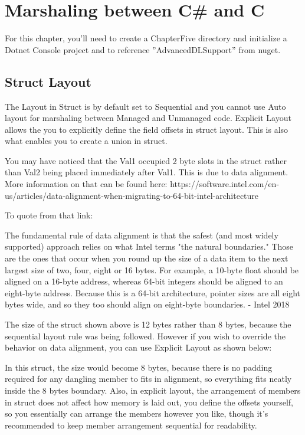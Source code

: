 \chapter{Marshaling between C\# and C}
For this chapter, you'll need to create a ChapterFive directory and initialize a Dotnet Console project and to reference ''AdvancedDLSupport'' from nuget.

\section{Struct Layout}
The Layout in Struct is by default set to Sequential and you cannot use Auto layout for marshaling between Managed and Unmanaged code. Explicit Layout allows the you to explicitly define the field offsets in struct layout. This is also what enables you to  create a union in struct.



You may have noticed that the Val1 occupied 2 byte slots in the struct rather than Val2 being placed immediately after Val1. This is due to data alignment.  More information on that can be found here: https://software.intel.com/en-us/articles/data-alignment-when-migrating-to-64-bit-intel-architecture

To quote from that link:

\begin{coloredbox}
	The fundamental rule of data alignment is that the safest (and most widely supported) approach relies on what Intel terms "the natural boundaries." Those are the ones that occur when you round up the size of a data item to the next largest size of two, four, eight or 16 bytes. For example, a 10-byte float should be aligned on a 16-byte address, whereas 64-bit integers should be aligned to an eight-byte address. Because this is a 64-bit architecture, pointer sizes are all eight bytes wide, and so they too should align on eight-byte boundaries. - Intel 2018
\end{coloredbox}

The size of the struct shown above is 12 bytes rather than 8 bytes, because the sequential layout rule was being followed. However if you wish to override the behavior on data alignment, you can use Explicit Layout as shown below:
\newpage


In this struct, the size would become 8 bytes, because there is no padding required for any dangling member to fits in alignment, so everything fits neatly inside the 8 bytes boundary. Also, in explicit layout, the arrangement of members in struct does not affect how memory is laid out, you define the offsets yourself, so you essentially can arrange the members however you like, though it's recommended to keep member arrangement sequential for readability.

